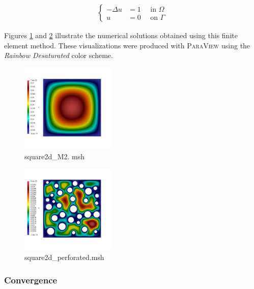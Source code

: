 \documentclass[english,10pt,a4paper]{article}
\begin{document}
\begin{eqnarray*}
\left\{
  \begin{aligned}
    - \Delta u &= 1 \quad \text{ in } \Omega \\
    u &= 0 \quad \text{ on } \Gamma
  \end{aligned}
  \right.
\end{eqnarray*}

Figures \ref{fig:res_square2d_M2} and \ref{fig:res_square2d_perforated} illustrate the numerical solutions obtained using this finite element method.
These visualizations were produced with \textsc{ParaView} using the \textit{Rainbow Desaturated} color scheme.

\begin{multicols}{2}
  \begin{figure}[H]
  \centering
  \includegraphics[width=0.4\textwidth]{images/resultat_f1_nonperfo.png}
  \caption{square2d\_M2. msh}
  \label{fig:res_square2d_M2}
  \end{figure}
  \columnbreak
  \begin{figure}[H]
  \centering
  \includegraphics[width=0.4\textwidth]{images/resultat_f1_perfo.png}
  \caption{square2d\_perforated.msh}
  \label{fig:res_square2d_perforated}
  \end{figure}
\end{multicols}


\subsubsection{Convergence}
\end{document}
